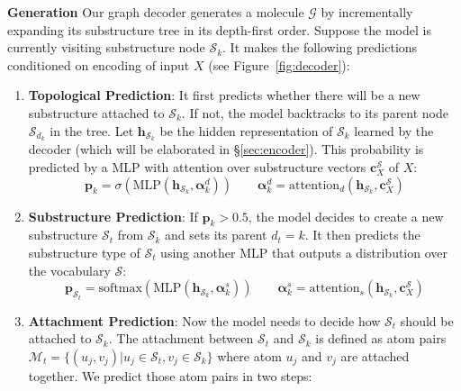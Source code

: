 \documentclass{article} \usepackage{iclr2020_conference,times}
\newcommand{\graph}{\mathcal{G}}
\newcommand{\MLP}{\mathrm{MLP}}
\newcommand{\attention}{\mathrm{attention}}
\newcommand{\set}[1]{\{ #1 \}}
\def\valpha{{\bm{\alpha}}}
\def\vc{{\bm{c}}}
\def\vh{{\bm{h}}}
\def\vp{{\bm{p}}}
\def\gM{{\mathcal{M}}}
\def\gS{{\mathcal{S}}}
\newcommand{\softmax}{\mathrm{softmax}}
\newcommand{\sigmoid}{\sigma}
\begin{document}
\textbf{Generation } 
Our graph decoder generates a molecule $\graph$ by incrementally expanding its substructure tree in its depth-first order. 
Suppose the model is currently visiting substructure node $\gS_k$. It makes the following predictions conditioned on encoding of input $X$ (see Figure~\ref{fig:decoder}):
\begin{enumerate}[leftmargin=*,topsep=0pt,itemsep=0pt]
    \item \textbf{Topological Prediction}: It first predicts whether there will be a new substructure attached to $\gS_k$. If not, the model backtracks to its parent node $\gS_{d_k}$ in the tree. Let $\vh_{\gS_k}$ be the hidden representation of $\gS_k$ learned by the decoder (which will be elaborated in \S\ref{sec:encoder}). This probability is predicted by a MLP with attention over substructure vectors $\vc_X^\gS$ of $X$: 
    \begin{equation}
        \vp_k = \sigmoid(\MLP(\vh_{\gS_k}, \valpha_k^d)) \qquad \valpha_k^d = \attention_d\left( \vh_{\gS_k}, \vc_X^\gS \right)
    \end{equation}
    
    \item \textbf{Substructure Prediction}: If $\vp_k > 0.5$, the model decides to create a new substructure $\gS_t$ from $\gS_k$ and sets its parent $d_t=k$. It then predicts the substructure type of $\gS_t$ using another MLP that outputs a distribution over the vocabulary $\gS$:
    \begin{equation}
        \vp_{\gS_t} = \softmax(\MLP(\vh_{\gS_k}, \valpha_k^s)) \qquad \valpha_k^s = \attention_s\left( \vh_{\gS_k}, \vc_X^\gS \right)
    \end{equation}
    
    \item \textbf{Attachment Prediction}: Now the model needs to decide how $\gS_t$ should be attached to $\gS_k$. The attachment between $\gS_t$ and $\gS_k$ is defined as atom pairs $\gM_t = \set{(u_j,v_j) | u_j \in \gS_t, v_j \in \gS_k}$ where atom $u_j$ and $v_j$ are attached together. We predict those atom pairs in two steps:
    

\end{enumerate}
\end{document}
